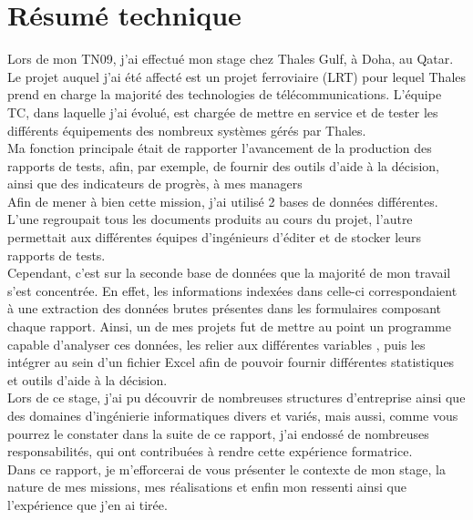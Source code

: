 \chapter*{Résumé technique}

Lors de mon TN09, j'ai effectué mon stage chez Thales Gulf, à Doha, au Qatar. Le projet auquel j'ai été affecté est un projet ferroviaire (\gls{LRT}) pour lequel Thales prend en charge la majorité des technologies de télécommunications. L'équipe \gls{TC}, dans laquelle j'ai évolué, est chargée de mettre en service et de tester les différents équipements des nombreux systèmes gérés par Thales. \\
Ma fonction principale était de rapporter l'avancement de la production des rapports de tests, afin, par exemple, de fournir des outils d'aide à la décision, ainsi que des indicateurs de progrès, à mes managers \\
Afin de mener à bien cette mission, j'ai utilisé 2 bases de données différentes. L'une regroupait tous les documents produits au cours du projet, l'autre permettait aux différentes équipes d'ingénieurs d'éditer et de stocker leurs rapports de tests. \\
Cependant, c'est sur la seconde base de données que la majorité de mon travail s'est concentrée. En effet, les informations indexées dans celle-ci correspondaient à une extraction des données brutes présentes dans les formulaires composant chaque rapport. Ainsi, un de mes projets fut de mettre au point un programme capable d'analyser ces données, les relier aux différentes variables , puis les intégrer au sein d'un fichier Excel afin de pouvoir fournir différentes statistiques et outils d'aide à la décision.\\
Lors de ce stage, j'ai pu découvrir de nombreuses structures d'entreprise ainsi que des domaines d'ingénierie informatiques divers et variés, mais aussi, comme vous pourrez le constater dans la suite de ce rapport, j'ai endossé de nombreuses responsabilités, qui ont contribuées à rendre cette expérience formatrice. \\
Dans ce rapport, je m'efforcerai de vous présenter le contexte de mon stage, la nature de mes missions, mes réalisations et enfin mon ressenti ainsi que l'expérience que j'en ai tirée.

